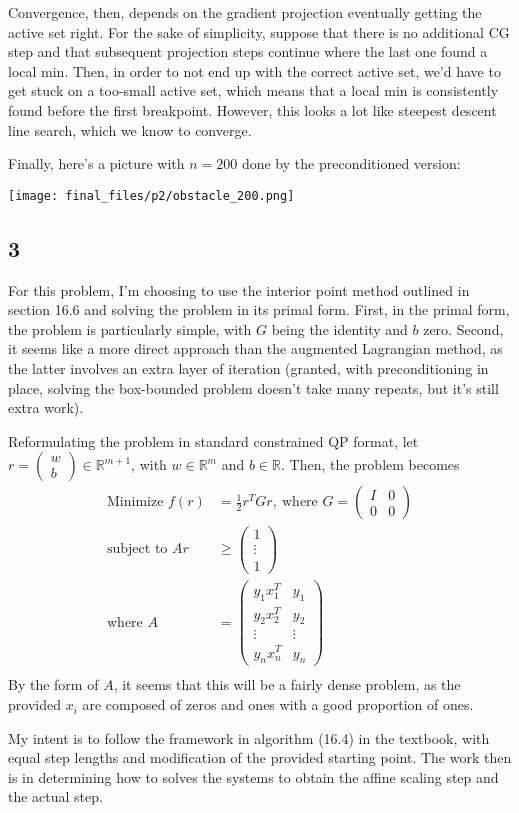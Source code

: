 \documentclass{article}
\newcommand{\openm}{\begin{pmatrix}}
\newcommand{\closem}{\end{pmatrix}}
\newcommand{\rn}{\mathbb{R}}
\begin{document}
Convergence, then, depends on the gradient projection eventually getting the active set right. For the sake of simplicity, suppose that there is no additional CG step and that subsequent projection steps continue where the last one found a local min. Then, in order to not end up with the correct active set, we'd have to get stuck on a too-small active set, which means that a local min is consistently found before the first breakpoint. However, this looks a lot like steepest descent line search, which we know to converge.

Finally, here's a picture with $n=200$ done by the preconditioned version:

\texttt{[image: final\_files/p2/obstacle\_200.png]}
\subsection*{3}
For this problem, I'm choosing to use the interior point method outlined in section 16.6 and solving the problem in its primal form. First, in the primal form, the problem is particularly simple, with $G$ being the identity and $b$ zero. Second, it seems like a more direct approach than the augmented Lagrangian method, as the latter involves an extra layer of iteration (granted, with preconditioning in place, solving the box-bounded problem doesn't take many repeats, but it's still extra work). 

Reformulating the problem in standard constrained QP format, let $r=\openm w\\b\closem\in\rn^{m+1}$, with $w\in\rn^m$ and $b\in\rn$. Then, the problem becomes 
\begin{align*}
    \text{Minimize }f(r)&=\frac{1}{2}r^TGr,\ \text{where }G=\openm I&0\\0&0\closem\\
    \text{subject to }Ar&\geq\openm 1\\\vdots\\1\closem\\
    \text{where }A&=\openm y_1x_1^T&y_1\\y_2x_2^T&y_2\\\vdots&\vdots\\y_nx_n^T&y_n\closem\\
\end{align*}
By the form of $A$, it seems that this will be a fairly dense problem, as the provided $x_i$ are composed of zeros and ones with a good proportion of ones. 

My intent is to follow the framework in algorithm (16.4) in the textbook, with equal step lengths and modification of the provided starting point. The work then is in determining how to solves the systems to obtain the affine scaling step and the actual step. 
\end{document}
